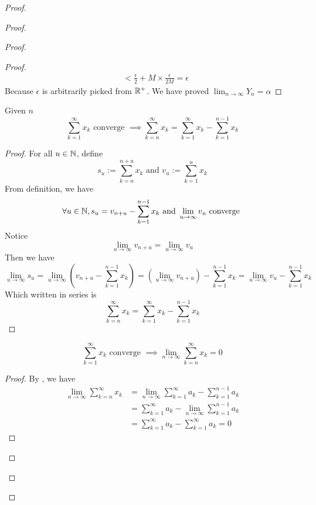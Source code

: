 \documentclass{report}
\begin{document}
\begin{proof}
\begin{proof}
\begin{proof}
\begin{proof}
\begin{align}
  &<\frac{\epsilon}{2}+M\times \frac{\epsilon }{2M}=\epsilon 
\end{align}
Because $\epsilon $ is arbitrarily picked from $\mathbb{R}^+$. We have proved  $\lim_{n\to\infty}Y_n=\alpha $
\end{proof}
\begin{lemma}
\label{8.4.2}
Given $n$
\begin{equation}
  \sum_{k=1}^\infty x_k\text{ converge }\implies \sum_{k=n}^\infty x_k=\sum_{k=1}^\infty x_k-\sum_{k=1}^{n-1}x_k
\end{equation}
\end{lemma}
\begin{proof}
For all $u\in\mathbb{N}$, define 
\begin{equation}
s_u:=\sum_{k=n}^{n+u}x_k\text{ and }v_u:=\sum_{k=1}^{u}x_k
\end{equation}
From definition, we have
\begin{equation}
  \forall u\in\mathbb{N},s_u=v_{n+u}-\sum_{k=1}^{n-1}x_k\text{ and }\lim_{u\to\infty}v_u\text{ converge }
\end{equation}
Notice 
\begin{equation}
\lim_{u\to\infty}v_{n+u}=\lim_{u\to\infty}v_u
\end{equation}
Then we have
\begin{equation}
\lim_{u\to\infty}s_u=\lim_{u\to\infty} (v_{n+u}-\sum_{k=1}^{n-1}x_k)=(\lim_{u\to\infty}v_{n+u})-\sum_{k=1}^{n-1}x_k=\lim_{u\to\infty}v_u-\sum_{k=1}^{n-1}x_k
\end{equation}
Which written in series is
\begin{equation}
\sum_{k=n}^{\infty} x_k=\sum_{k=1}^\infty x_k-\sum_{k=1}^{n-1}x_k
\end{equation}
\end{proof}
\begin{lemma}
\label{8.4.3}
\begin{equation}
\sum_{k=1}^\infty x_k\text{ converge }\implies \lim_{n\to\infty}\sum_{k=n}^\infty x_k=0
\end{equation}
\end{lemma}
\begin{proof} 
By , we have
\begin{align}
  \lim_{n\to\infty}\sum_{k=n}^\infty x_k&=\lim_{n\to\infty}\sum_{k=1}^\infty a_k-\sum_{k=1}^{n-1}a_k\\
  &=\sum_{k=1}^\infty a_k-\lim_{n\to\infty}\sum_{k=1}^{n-1}a_k\\
  &=\sum_{k=1}^\infty a_k-\sum_{k=1}^\infty a_k=0
\end{align}

\end{proof}
\end{proof}
\end{proof}
\end{proof}
\end{document}
